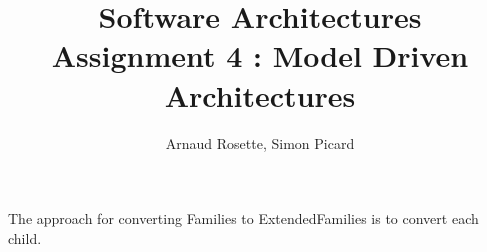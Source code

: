 \documentclass[a4paper,10pt]{article}
\title{Software Architectures\\ Assignment 4 : Model Driven Architectures}
\author{Arnaud Rosette, Simon Picard}
\begin{document}
The approach for converting Families to ExtendedFamilies is to convert each child.
\end{document}
